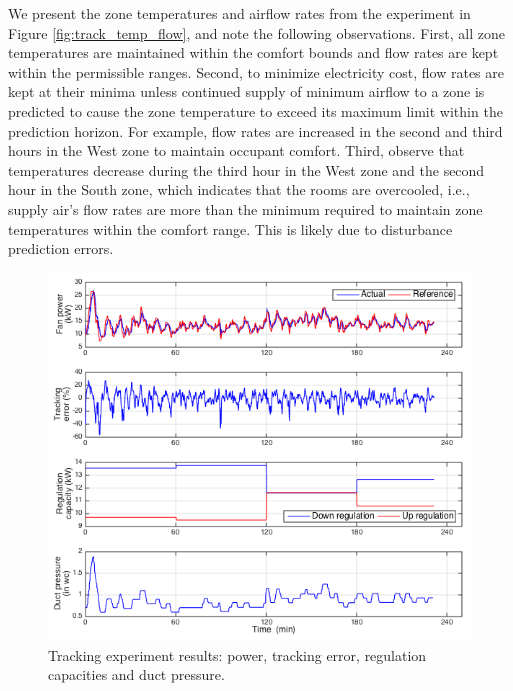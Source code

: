We present the zone temperatures and airflow rates from the experiment in Figure \ref{fig:track_temp_flow}, and note the following observations. 
First, all zone temperatures are maintained within the comfort bounds and flow rates are kept within the permissible ranges. 
Second, to minimize electricity cost, flow rates are kept at their minima unless continued supply of minimum airflow to a zone is predicted to cause the zone temperature to exceed its maximum limit within the prediction horizon. 
For example, flow rates are increased in the second and third hours in the West zone to maintain occupant comfort. 
Third, observe that temperatures decrease during the third hour in the West zone and the second hour in the South zone, which indicates that the rooms are overcooled, i.e., supply air's flow rates are more than the minimum required to maintain zone temperatures within the comfort range. 
This is likely due to disturbance prediction errors.


\begin{figure}[t]
\centering
\vspace*{1cm}
\includegraphics[width=\textwidth]{chapters/building_exp/figures/Track_power.png}
\caption{Tracking experiment results: power, tracking error, regulation capacities and duct pressure.}
\label{fig:track_power}
\end{figure}

